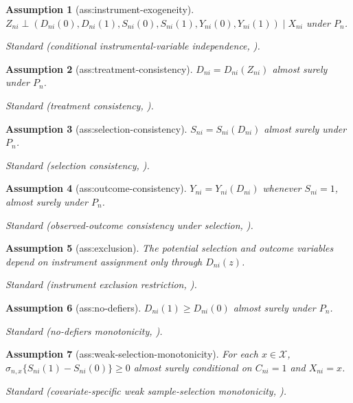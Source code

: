 \documentclass{article}
\newtheorem{assumption}{Assumption}
\begin{document}
\begin{assumption}[ass:instrument-exogeneity]\label{ass:instrument-exogeneity}
\(Z_{ni}\perp(D_{ni}(0),D_{ni}(1),S_{ni}(0),S_{ni}(1),Y_{ni}(0),Y_{ni}(1))\mid X_{ni}\) under \(P_n\).
\par\smallskip\noindent\emph{Standard} (conditional instrumental-variable independence, \cite{ChenFlores2015}).
\end{assumption}

\begin{assumption}[ass:treatment-consistency]\label{ass:treatment-consistency}
\(D_{ni}=D_{ni}(Z_{ni})\) almost surely under \(P_n\).
\par\smallskip\noindent\emph{Standard} (treatment consistency, \cite{ChenFlores2015}).
\end{assumption}

\begin{assumption}[ass:selection-consistency]\label{ass:selection-consistency}
\(S_{ni}=S_{ni}(D_{ni})\) almost surely under \(P_n\).
\par\smallskip\noindent\emph{Standard} (selection consistency, \cite{ChenFlores2015}).
\end{assumption}

\begin{assumption}[ass:outcome-consistency]\label{ass:outcome-consistency}
\(Y_{ni}=Y_{ni}(D_{ni})\) whenever \(S_{ni}=1\), almost surely under \(P_n\).
\par\smallskip\noindent\emph{Standard} (observed-outcome consistency under selection, \cite{ChenFlores2015}).
\end{assumption}

\begin{assumption}[ass:exclusion]\label{ass:exclusion}
The potential selection and outcome variables depend on instrument assignment only through \(D_{ni}(z)\).
\par\smallskip\noindent\emph{Standard} (instrument exclusion restriction, \cite{ChenFlores2015}).
\end{assumption}

\begin{assumption}[ass:no-defiers]\label{ass:no-defiers}
\(D_{ni}(1)\ge D_{ni}(0)\) almost surely under \(P_n\).
\par\smallskip\noindent\emph{Standard} (no-defiers monotonicity, \cite{ChenFlores2015}).
\end{assumption}

\begin{assumption}[ass:weak-selection-monotonicity]\label{ass:weak-selection-monotonicity}
For each \(x\in\mathcal X\), \(\sigma_{n,x}\{S_{ni}(1)-S_{ni}(0)\}\ge0\) almost surely conditional on \(C_{ni}=1\) and \(X_{ni}=x\).
\par\smallskip\noindent\emph{Standard} (covariate-specific weak sample-selection monotonicity, \cite{DongHeiler2026}).
\end{assumption}
\end{document}
